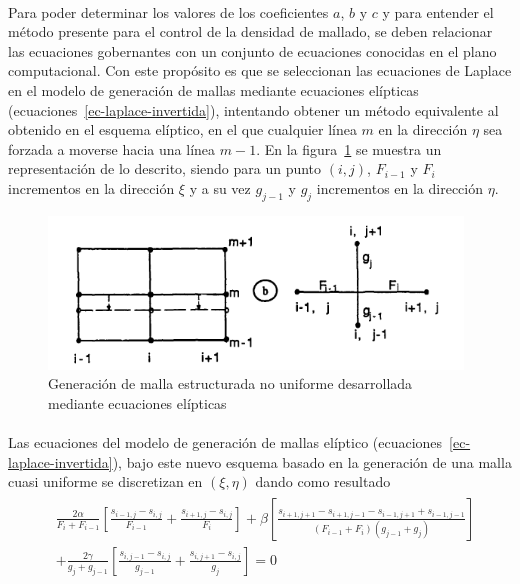 \documentclass[letterpaper, openright, 12pt]{book}
\begin{document}
    \paragraph*{}
    Para poder determinar los valores de los coeficientes $a$, $b$ y $c$ y
    para entender el método presente para el control de la densidad de
    mallado, se deben relacionar las ecuaciones gobernantes con un conjunto
    de ecuaciones conocidas en el plano computacional. Con este propósito es
    que se seleccionan las ecuaciones de Laplace en el modelo de generación
    de mallas mediante ecuaciones elípticas
    (ecuaciones~\ref{ec-laplace-invertida}), intentando obtener un método
    equivalente al obtenido en el esquema elíptico, en el que cualquier línea
    $m$ en la dirección $\eta$ sea forzada a moverse hacia una línea $m - 1$.
    En la figura~\ref{fig:eliptic_non_uniform} se muestra un representación de
    lo descrito, siendo para un punto $(i, j)$, $F_{i-1}$ y $F_i$ incrementos
    en la dirección $\xi$ y a su vez $g_{j-1}$ y $g_j$ incrementos en la
    dirección $\eta$.\\
    \begin{figure}[htbp!]
        \centering
        \includegraphics[keepaspectratio, width=110mm]
        {./img/eliptic_non_uniform.png}
        \caption[Generación de malla por ecuaciones elípticas]{Generación de
        malla estructurada no uniforme desarrollada mediante ecuaciones
        elípticas \cite{siladicParabolic}}
        \label{fig:eliptic_non_uniform}
    \end{figure}

    \paragraph*{}
    Las ecuaciones del modelo de generación de mallas elíptico
    (ecuaciones~\ref{ec-laplace-invertida}), bajo este nuevo esquema basado en
    la generación de una malla cuasi uniforme se discretizan en $(\xi, \eta)$
    dando como resultado
    \begin{align}
        &\begin{aligned}
            &\frac{2\alpha}{F_i + F_{i - 1}} \left[ \frac{s_{i-1, j}
                - s_{i, j}}{F_{i - 1}} + \frac{s_{i+1, j}
                - s_{i, j}}{F_i} \right] + \beta \left[ \frac{ s_{i+1, j+1}
                - s_{i+1, j-1} - s_{i-1, j + 1} + s_{i-1, j-1} }{ (F_{i - 1}
                + F_i) (g_{j - 1} + g_j) } \right]\\&
                + \frac{2\gamma}{g_j + g_{j - 1}} \left[ \frac{s_{i, j-1}
                - s_{i, j}}{g_{j - 1}}  + \frac{s_{i, j+1}
                - s_{i, j}}{g_j}\right] = 0
        &\end{aligned}
        \label{eliptic_non_uniform}
    \end{align}
\end{document}
